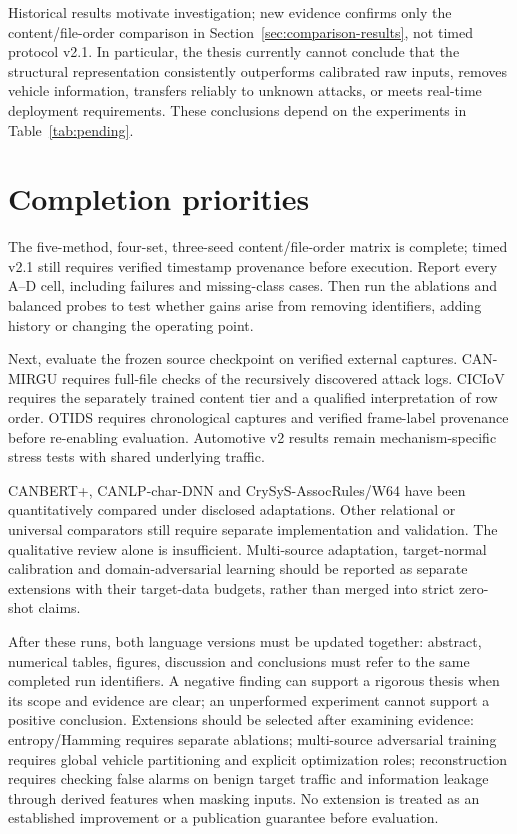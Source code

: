\documentclass[12pt,a4paper,oneside,openany]{extbook}
\begin{document}
Historical results motivate investigation; new evidence confirms only the content/file-order comparison in Section~\ref{sec:comparison-results}, not timed protocol v2.1. In particular, the thesis currently cannot conclude that the structural representation consistently outperforms calibrated raw inputs, removes vehicle information, transfers reliably to unknown attacks, or meets real-time deployment requirements. These conclusions depend on the experiments in Table~\ref{tab:pending}.

\section{Completion priorities}
The five-method, four-set, three-seed content/file-order matrix is complete; timed v2.1 still requires verified timestamp provenance before execution. Report every A--D cell, including failures and missing-class cases. Then run the ablations and balanced probes to test whether gains arise from removing identifiers, adding history or changing the operating point.

Next, evaluate the frozen source checkpoint on verified external captures. CAN-MIRGU requires full-file checks of the recursively discovered attack logs. CICIoV requires the separately trained content tier and a qualified interpretation of row order. OTIDS requires chronological captures and verified frame-label provenance before re-enabling evaluation. Automotive v2 results remain mechanism-specific stress tests with shared underlying traffic.

CANBERT+, CANLP-char-DNN and CrySyS-AssocRules/W64 have been quantitatively compared under disclosed adaptations. Other relational or universal comparators still require separate implementation and validation. The qualitative review alone is insufficient. Multi-source adaptation, target-normal calibration and domain-adversarial learning should be reported as separate extensions with their target-data budgets, rather than merged into strict zero-shot claims.

After these runs, both language versions must be updated together: abstract, numerical tables, figures, discussion and conclusions must refer to the same completed run identifiers. A negative finding can support a rigorous thesis when its scope and evidence are clear; an unperformed experiment cannot support a positive conclusion.
Extensions should be selected after examining evidence: entropy/Hamming requires separate ablations; multi-source adversarial training requires global vehicle partitioning and explicit optimization roles; reconstruction requires checking false alarms on benign target traffic and information leakage through derived features when masking inputs. No extension is treated as an established improvement or a publication guarantee before evaluation.
\end{document}
